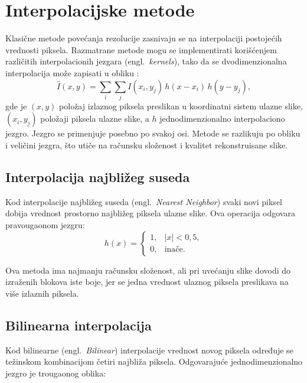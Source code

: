 \documentclass[12pt,a4paper]{article}
\begin{document}
\section{Interpolacijske metode}
\label{sec:interpolacija}

Klasične metode povećanja rezolucije zasnivaju se na interpolaciji postojećih vrednosti piksela. Razmatrane metode mogu se implementirati korišćenjem različitih interpolacionih jezgara (engl.\ \textit{kernels}), tako da se dvodimenzionalna interpolacija može zapisati u obliku \cite{meijering2002}:
\begin{equation}
	\hat{I}(x,y) = \sum_{i}\sum_{j} I(x_i, y_j)\, h(x - x_i)\, h(y - y_j),
\end{equation}
gde je $(x,y)$ položaj izlaznog piksela preslikan u koordinatni sistem ulazne slike, $(x_i,y_j)$ položaji piksela ulazne slike, a $h$ jednodimenzionalno interpolaciono jezgro. Jezgro se primenjuje posebno po svakoj osi. Metode se razlikuju po obliku i veličini jezgra, što utiče na računsku složenost i kvalitet rekonstruisane slike.

\subsection{Interpolacija najbližeg suseda}

Kod interpolacije najbližeg suseda (engl.\ \textit{Nearest Neighbor}) svaki novi piksel dobija vrednost prostorno najbližeg piksela ulazne slike. Ova operacija odgovara pravougaonom jezgru:
\begin{equation}
	h(x) =
	\begin{cases}
		1, & |x| < 0{,}5, \\
		0, & \text{inače.}
	\end{cases}
\end{equation}

Ova metoda ima najmanju računsku složenost, ali pri uvećanju slike dovodi do izraženih blokova iste boje, jer se jedna vrednost ulaznog piksela preslikava na više izlaznih piksela.

\subsection{Bilinearna interpolacija}

Kod bilinearne (engl.\ \textit{Bilinear}) interpolacije vrednost novog piksela određuje se težinskom kombinacijom četiri najbliža piksela. Odgovarajuće jednodimenzionalno jezgro je trougaonog oblika:
\end{document}
